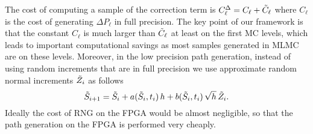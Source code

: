 The cost of computing a sample of the correction term is $C^{\Delta}_\ell = C_\ell+ \Tilde{C}_\ell$ where $C_\ell$ is the cost of generating $\Delta P_\ell$ in full precision. 
The key point of our framework is that the constant $C_\ell$ is much larger than $\Tilde{C}_\ell$ at least on the first MC levels, which leads to important computational savings as most samples generated in MLMC are on these levels.
Moreover, in the low precision path generation, instead of using random increments that are in full precision we use approximate random normal increments $\Tilde{Z}_i$ as follows 
\begin{equation}\label{eq:GBM_sde_fi}
    \Tilde{S}_{i+1} = \Tilde{S}_{i} + a(\Tilde{S}_i,t_i) \, h + b(\Tilde{S}_i,t_i)\, \sqrt{h}  \, \Tilde{Z}_i.
\end{equation}
Ideally the cost of RNG on the FPGA would be almost negligible, so that the path generation on the FPGA is performed very cheaply.




